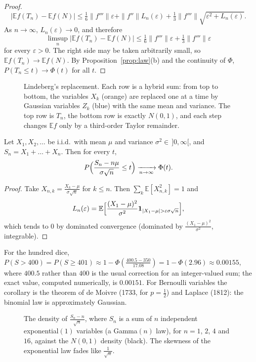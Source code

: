\begin{proof}
\[
\bigl|\mathbb E f(T_n)-\mathbb E f(N)\bigr|\le\tfrac16\|f'''\|\varepsilon+\|f''\|L_n(\varepsilon)+\tfrac13\|f'''\|\sqrt{\varepsilon^2+L_n(\varepsilon)}.
\]
As $n\to\infty$, $L_n(\varepsilon)\to0$, and therefore
\[
\limsup_n\bigl|\mathbb E f(T_n)-\mathbb E f(N)\bigr|\le\tfrac16\|f'''\|\varepsilon+\tfrac13\|f'''\|\varepsilon
\]
for every $\varepsilon>0$. The right side may be taken arbitrarily small, so $\mathbb E f(T_n)\to\mathbb E f(N)$. By Proposition~\ref{prop:law}(b) and the continuity of $\Phi$, $P(T_n\le t)\to\Phi(t)$ for all $t$.
\end{proof}

\begin{figure}[ht]
\centering
{}
\caption{Lindeberg's replacement. Each row is a hybrid sum: from top to bottom, the variables $X_k$ (orange) are replaced one at a
time by Gaussian variables $Z_k$ (blue) with the same mean and variance. The top row is $T_n$, the bottom row is exactly $N(0,1)$, and
each step changes $\mathbb E f$ only by a third-order Taylor remainder.}
\label{fig:lindeberg}
\end{figure}

\begin{corollary}\label{cor:clt}
Let $X_1,X_2,\ldots$ be i.i.d.\ with mean $\mu$ and variance $\sigma^2\in\,]0,\infty[$, and $S_n=X_1+\dots+X_n$. Then for every $t$,
\[
P\Bigl(\frac{S_n-n\mu}{\sigma\sqrt n}\le t\Bigr)\xrightarrow[n\to\infty]{}\Phi(t).
\]
\end{corollary}
\begin{proof}
Take $X_{n,k}=\frac{X_k-\mu}{\sigma\sqrt n}$ for $k\le n$. Then $\sum_k\mathbb E[X_{n,k}^2]=1$ and
\[
L_n(\varepsilon)=\mathbb E\Bigl[\frac{(X_1-\mu)^2}{\sigma^2}\mathbf 1_{|X_1-\mu|>\varepsilon\sigma\sqrt n}\Bigr],
\]
which tends to $0$ by
dominated convergence (dominated by $\frac{(X_1-\mu)^2}{\sigma^2}$, integrable).
\end{proof}

For the hundred dice, $P(S>400)=P(S\ge401)\approx1-\Phi(\frac{400.5-350}{17.08})=1-\Phi(2.96)\approx0.00155$, where $400.5$ rather than $400$ is the usual
correction for an integer-valued sum; the exact value, computed numerically, is $0.00151$. For Bernoulli
variables the corollary is the theorem of de Moivre (1733, for $p=\frac12$) and Laplace (1812): the binomial law is
approximately Gaussian.

\begin{figure}[ht]
\centering
{}
\caption{The density of $\frac{S_n-n}{\sqrt n}$, where $S_n$ is a sum of $n$ independent exponential$(1)$ variables (a Gamma$(n)$ law), for $n=1$, $2$, $4$ and
$16$, against the $N(0,1)$ density (black). The skewness of the exponential law fades like $\frac1{\sqrt n}$.}
\label{fig:sums}
\end{figure}


